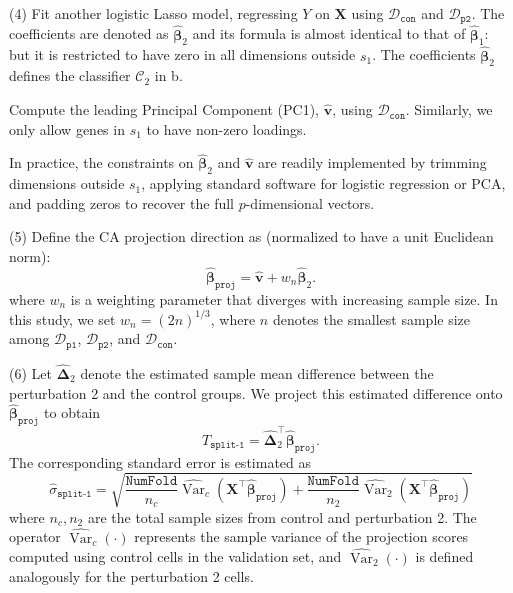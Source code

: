 \documentclass[11pt]{article}
\begin{document}
(4) Fit another logistic Lasso model, regressing $Y$ on $\bm{X}$ using $\mathcal{D}_{\texttt{con}}$ and $\mathcal{D}_{\texttt{p2}}$. The coefficients are denoted as $\widehat{\bm \beta}_2$ and its formula is almost identical to that of $\widehat{\bm \beta}_1$: but it is restricted to have zero in all dimensions outside $s_1$. The coefficients $\widehat{\bm{\beta}}_2$ defines the classifier $\mathcal{C}_2$ in b. 


Compute the leading Principal Component (PC1), $\hat{\bm{v}}$, using $\mathcal{D}_{\texttt{con}}$. Similarly, we only allow genes in $s_1$ to have non-zero loadings.

In practice, the constraints on $\widehat{\bm{\beta}}_2$ and $\hat{\bm{v}}$ are readily implemented by trimming dimensions outside $s_1$, applying standard software for logistic regression or PCA, and padding zeros to recover the full $p$-dimensional vectors.

(5) Define the CA projection direction as (normalized to have a unit Euclidean norm):
$$
\widehat{\bm{\beta}}_{\texttt{proj}} = \hat{\bm{v}} + w_n\widehat{\bm{\beta}}_{2}.
$$
where $w_n$ is a weighting parameter that diverges with increasing sample size. In this study, we set $w_n = (2n)^{1/3}$, where $n$ denotes the smallest sample size among $\mathcal{D}_{\texttt{p1}}$, $\mathcal{D}_{\texttt{p2}}$, and $\mathcal{D}_{\texttt{con}}$.

(6) Let $\widehat{\bm{\Delta}}_2$ denote the estimated sample mean difference between the perturbation 2 and the control groups. We project this estimated difference onto $\widehat{\bm{\beta}}_{\texttt{proj}}$ to obtain
$$
T_{\texttt{split-1}} = \widehat{\bm{\Delta}}_2^\top \widehat{\bm{\beta}}_{\texttt{proj}}.
$$
The corresponding standard error is estimated as
$$
\hat\sigma_{\texttt{split-1}} = \sqrt{\frac{\texttt{NumFold}}{n_c}\widehat{\operatorname{Var}}_c(\bm{X}^\top \widehat{\bm{\beta}}_{\texttt{proj}}) + \frac{\texttt{NumFold}}{n_2}\widehat{\operatorname{Var}}_2(\bm{X}^\top \widehat{\bm{\beta}}_{\texttt{proj}})}
$$
where $n_c, n_2$ are the total sample sizes from control and perturbation 2. The operator $\widehat{\operatorname{Var}}_c(\cdot)$ represents the sample variance of the projection scores computed using control cells in the validation set, and $\widehat{\operatorname{Var}}_2(\cdot)$ is defined analogously for the perturbation 2 cells.
\end{document}
